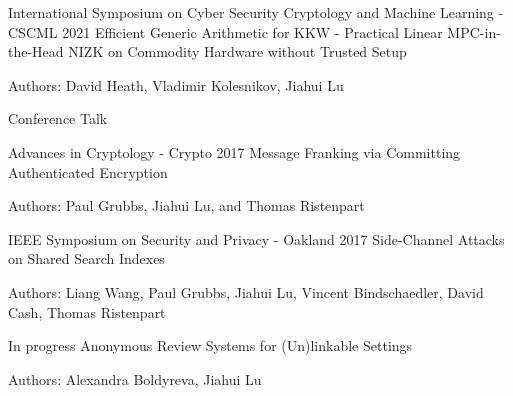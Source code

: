 


\begin{cventries}


\cventry
{International Symposium on Cyber Security Cryptology and Machine Learning - CSCML 2021} %
{Efficient Generic Arithmetic for KKW - Practical Linear MPC-in-the-Head NIZK on Commodity Hardware without Trusted Setup} %
{} %
{} %
{ %
\begin{cvitems}
\item {Authors: David Heath, Vladimir Kolesnikov, Jiahui Lu}
\item {Conference Talk}
\end{cvitems}
}


\cventry
{Advances in Cryptology - Crypto 2017} %
{Message Franking via Committing Authenticated Encryption} %
{} %
{} %
{ %
	\begin{cvitems}
		\item {Authors: Paul Grubbs, Jiahui Lu, and Thomas Ristenpart}
	\end{cvitems}
}


\cventry
{IEEE Symposium on Security and Privacy - Oakland 2017} %
{Side-Channel Attacks on Shared Search Indexes} %
{} %
{} %
{ %
	\begin{cvitems}
		\item {Authors: Liang Wang, Paul Grubbs, Jiahui Lu, Vincent Bindschaedler, David Cash, Thomas Ristenpart}
	\end{cvitems}
}


\cventry
{In progress} %
{Anonymous Review Systems for (Un)linkable Settings} %
{}
{}
{ %
	\begin{cvitems}
		\item {Authors: Alexandra Boldyreva, Jiahui Lu}
	\end{cvitems}
}


\end{cventries}